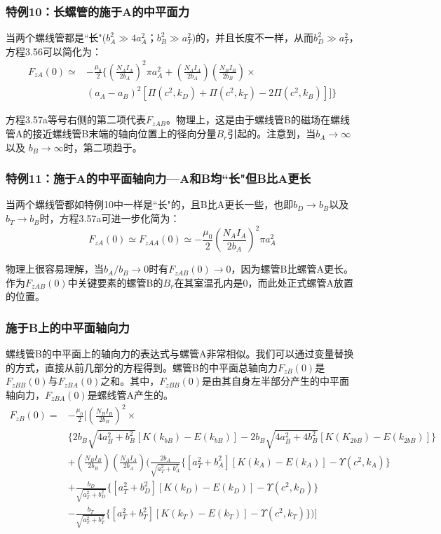 \subsubsection{特例10：长螺管的施于A的中平面力}
当两个螺线管都是``长"($b_A^2\gg 4a_A^2；b_B^2\gg a_T^2$)的，并且长度不一样，从而$b_D^2\gg a_T^2$，方程3.56可以简化为：
\begin{equation}
\begin{split}
F_{zA}(0)\simeq& -\frac{\mu_0}{2}\{(\frac{N_AI_A}{2b_A})^2\pi a_A^2+(\frac{N_AI_A}{2b_A})(\frac{N_BI_B}{2b_{B}})\times\\
&(a_A-a_B)^2[\Pi(c^2,k_D)+\Pi(c^2,k_T)-2\Pi(c^2,k_B)]]\}
\end{split}
\end{equation}

方程3.57a等号右侧的第二项代表$F_{zAB}$。物理上，这是由于螺线管B的磁场在螺线管A的接近螺线管B末端的轴向位置上的径向分量$B_r$引起的。注意到，当$b_A\rightarrow \infty$以及 $b_B\rightarrow \infty$时，第二项趋于。
\subsubsection{特例11：施于A的中平面轴向力---A和B均``长"但B比A更长}
当两个螺线管都如特例10中一样是``长"的，且B比A更长一些，也即$b_D\rightarrow b_B$以及$b_T\rightarrow b_B$时，方程3.57a可进一步化简为：
\begin{equation*}
F_{zA}(0)\simeq F_{zAA}(0)\simeq -\frac{\mu_0}{2}(\frac{N_AI_A}{2b_A})^2\pi a_A^2 \tag{3.57'}
\end{equation*}

物理上很容易理解，当$b_A/b_B\rightarrow 0$时有$F_{zAB}(0)\rightarrow 0$，因为螺管B比螺管A更长。作为$F_{zAB}(0)$中关键要素的螺管B的$B_r$在其室温孔内是0，而此处正式螺管A放置的位置。

\subsubsection{施于B上的中平面轴向力}
螺线管B的中平面上的轴向力的表达式与螺管A非常相似。我们可以通过变量替换的方式，直接从前几部分的方程得到。螺管B的中平面总轴向力$F_{zB}(0)$是$F_{zBB}(0)$与$F_{zBA}(0)$之和。其中，$F_{zBB}(0)$是由其自身左半部分产生的中平面轴向力，$F_{zBA}(0)$是螺线管A产生的。
\begin{equation}
\begin{split}
F_{zB}(0)=&-\frac{\mu_0}{2}\bigg[(\frac{N_BI_B}{2b_B})^2\times\\
&\{2b_B\sqrt{4a_B^2+b_B^2}[K(k_{bB})-E(k_{bB})]-2b_B\sqrt{4a_B^2+4b_B^2}[K(K_{2bB})-E(k_{2bB})]\}\\
&+(\frac{N_BI_B}{2b_B})(\frac{N_AI_A}{2b_A})\big(\frac{2b_A}{\sqrt{a_T^2+b_A^2}}\{[a_T^2+b_A^2][K(k_A)-E(k_A)]-\Upsilon(c^2,k_A)\}\\
&+\frac{b_D}{\sqrt{a_T^2+b_D^2}}\{[a_T^2+b_D^2][K(k_D)-E(k_D)]-\Upsilon(c^2,k_D)\}\\
&-\frac{b_T}{\sqrt{a_T^2+b_T^2}}\{[a_T^2+b_T^2][K(k_T)-E(k_T)]-\Upsilon(c^2,k_T)\}\big)\bigg]
\end{split}
\end{equation}

